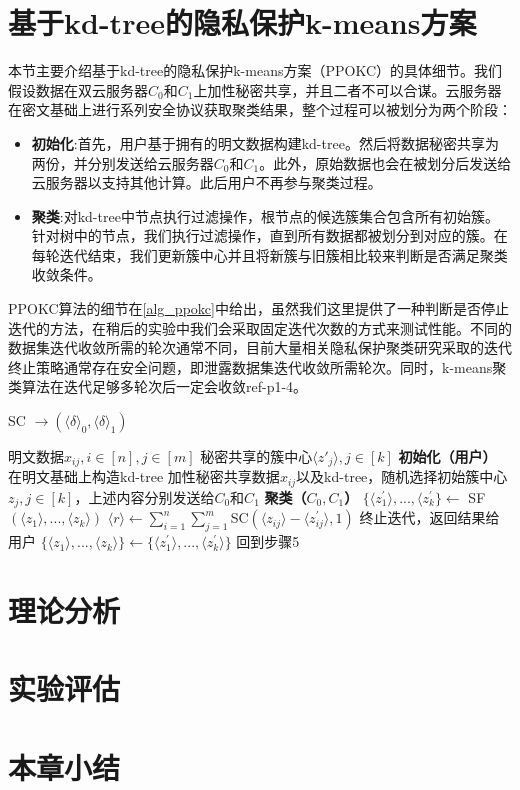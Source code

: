\section{基于kd-tree的隐私保护k-means方案}
\label{s3-ppokc}
本节主要介绍基于kd-tree的隐私保护k-means方案（PPOKC）的具体细节。我们假设数据在双云服务器$C_0$和$C_1$上加性秘密共享，并且二者不可以合谋。云服务器在密文基础上进行系列安全协议获取聚类结果，整个过程可以被划分为两个阶段：
\begin{itemize}
    \item \textbf{初始化}:首先，用户基于拥有的明文数据构建kd-tree。然后将数据秘密共享为两份，并分别发送给云服务器$C_0$和$C_1$。此外，原始数据也会在被划分后发送给云服务器以支持其他计算。此后用户不再参与聚类过程。
    \item \textbf{聚类}:对kd-tree中节点执行过滤操作，根节点的候选簇集合包含所有初始簇。针对树中的节点，我们执行过滤操作，直到所有数据都被划分到对应的簇。在每轮迭代结束，我们更新簇中心并且将新簇与旧簇相比较来判断是否满足聚类收敛条件。
\end{itemize}

PPOKC算法的细节在\ref{alg_ppokc}中给出，虽然我们这里提供了一种判断是否停止迭代的方法，在稍后的实验中我们会采取固定迭代次数的方式来测试性能。不同的数据集迭代收敛所需的轮次通常不同，目前大量相关隐私保护聚类研究采取的迭代终止策略通常存在安全问题，即泄露数据集迭代收敛所需轮次。同时，k-means聚类算法在迭代足够多轮次后一定会收敛ref-p1-4。
\begin{algorithm}[htbp]
    \renewcommand{\algorithmicrequire}{\textbf{输入:}}
    \renewcommand{\algorithmicensure}{\textbf{输出:}}
    \caption{SC $\rightarrow (\langle \delta \rangle_0, \langle \delta \rangle_1)$}
    \label{alg_ppokc}
    \begin{algorithmic}[1]
        \REQUIRE 明文数据$x_{ij},i\in[n],j\in[m]$
        \ENSURE 秘密共享的簇中心$\langle z'_j \rangle,j\in[k]$
        \STATE \textbf{初始化（用户）}
        \STATE 在明文基础上构造kd-tree
        \STATE 加性秘密共享数据$x_{ij}$以及kd-tree，随机选择初始簇中心$z_j,j\in[k]$，上述内容分别发送给$C_0$和$C_1$
        \STATE \textbf{聚类（$C_0,C_1$）}
        \STATE $\{\langle z^{\prime}_1 \rangle,...,\langle z^{\prime}_k\} \leftarrow$ SF$(\langle z_1\rangle,...,\langle z_k\rangle)$
        \STATE $\langle r \rangle \leftarrow \sum_{i=1}^{n}\sum_{j=1}^{m}$SC$(\langle z_{ij}\rangle-\langle z_{ij}^{\prime}\rangle, 1)$
        \STATE 终止迭代，返回结果给用户
        \ELSE
        \STATE $\{\langle z_1 \rangle,...,\langle z_k \rangle \} \leftarrow \{\langle z^{\prime}_1 \rangle,...,\langle z^{\prime}_k\rangle\}$
        \STATE 回到步骤5
        \ENDIF
    \end{algorithmic}
\end{algorithm}

\section{理论分析}
\label{s3-lilun}
\section{实验评估}
\label{s3-shiyan}
\section{本章小结}
\label{s3-xiaojie}